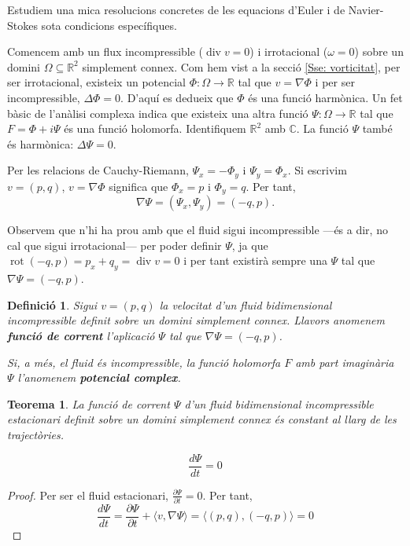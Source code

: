 \documentclass{article}
\numberwithin{equation}{section}
\DeclareMathOperator{\diver}{div}
\DeclareMathOperator{\rot}{rot}
\newtheorem{teorema}{Teorema}[section]
\newtheorem{definicio}{Definici\'{o}}[section]
\begin{document}
Estudiem una mica resolucions concretes de les equacions d'Euler i de Navier-Stokes sota condicions espec\'{i}fiques.

Comencem amb un flux incompressible ($\diver v=0$) i irrotacional ($\omega=0$) sobre un domini $\Omega\subseteq\mathbb{R}^2$ simplement connex. Com hem vist a la secci\'{o} \ref{Sse: vorticitat}, per ser irrotacional, existeix un potencial $\Phi:\Omega\rightarrow\mathbb{R}$ tal que $v=\nabla\Phi$ i per ser incompressible, $\Delta\Phi=0$. D'aqu\'{i} es dedueix que $\Phi$ \'{e}s una funci\'{o} harm\`{o}nica. Un fet b\`{a}sic de l'an\`{a}lisi complexa indica que existeix una altra funci\'{o} $\Psi:\Omega\rightarrow\mathbb{R}$ tal que $F=\Phi+i\Psi$ \'{e}s una funci\'{o} holomorfa. Identifiquem $\mathbb{R}^2$ amb $\mathbb{C}$. La funci\'{o} $\Psi$ tamb\'{e} \'{e}s harm\`{o}nica: $\Delta\Psi=0$.

Per les relacions de Cauchy-Riemann, $\Psi_x=-\Phi_y$ i $\Psi_y=\Phi_x$. Si escrivim $v=(p,q)$, $v=\nabla\Phi$ significa que $\Phi_x=p$ i $\Phi_y=q$. Per tant,
\[\nabla\Psi=(\Psi_x,\Psi_y)=(-q,p).\]

Observem que n'hi ha prou amb que el fluid sigui incompressible ---\'{e}s a dir, no cal que sigui irrotacional--- per poder definir $\Psi$, ja que $\rot(-q,p)=p_x+q_y=\diver v=0$ i per tant existir\`{a} sempre una $\Psi$ tal que $\nabla\Psi=(-q,p)$.

\begin{definicio}
Sigui $v=(p,q)$ la velocitat d'un fluid bidimensional incompressible definit sobre un domini simplement connex. Llavors anomenem \textbf{funci\'{o} de corrent} l'aplicaci\'{o} $\Psi$ tal que $\nabla\Psi=(-q,p)$.

Si, a m\'{e}s, el fluid \'{e}s incompressible, la funci\'{o} holomorfa $F$ amb part imagin\`{a}ria $\Psi$ l'anomenem \textbf{potencial complex}.
\end{definicio}

\begin{teorema}
La funci\'{o} de corrent $\Psi$ d'un fluid bidimensional incompressible estacionari definit sobre un domini simplement connex \'{e}s constant al llarg de les traject\`{o}ries.

\[\frac{d\Psi}{dt}=0\]
\end{teorema}
\begin{proof}
Per ser el fluid estacionari, $\frac{\partial\Psi}{\partial t}=0$. Per tant,
\[\frac{d\Psi}{dt}=\frac{\partial\Psi}{\partial t}+\langle v,\nabla\Psi\rangle=\langle(p,q),(-q,p)\rangle=0\]
\end{proof}
\end{document}
